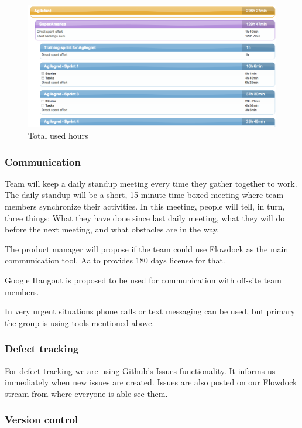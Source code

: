 \begin{figure}[H]
\centering
\includegraphics[width=1\textwidth]{imgs/totalhours.png}
\caption{Total used hours}
\label{fig:totalhours}
\end{figure}

\subsubsection{Communication}

Team will keep a daily standup meeting every time they gather together to work. 
The daily standup will be a short, 15-minute time-boxed meeting where team 
members synchronize their activities. In this meeting, people will tell, in 
turn, three things: What they have done since last daily meeting, what they 
will do before the next meeting, and what obstacles are in the way.  

The product manager will propose if the team could use Flowdock as the main 
communication tool. Aalto provides 180 days license for that.

Google Hangout is proposed to be used for communication with off-site team 
members.

In very urgent situations phone calls or text messaging can be used, but 
primary the group is using tools mentioned above.

\subsubsection{Defect tracking}

For defect tracking we are using Github's
\href{https://github.com/soberit/mobilefant/issues?state=open}{Issues}
functionality. It informs us immediately when new issues are created. Issues are also posted on our Flowdock stream from where everyone is able see them.

\subsubsection{Version control}

